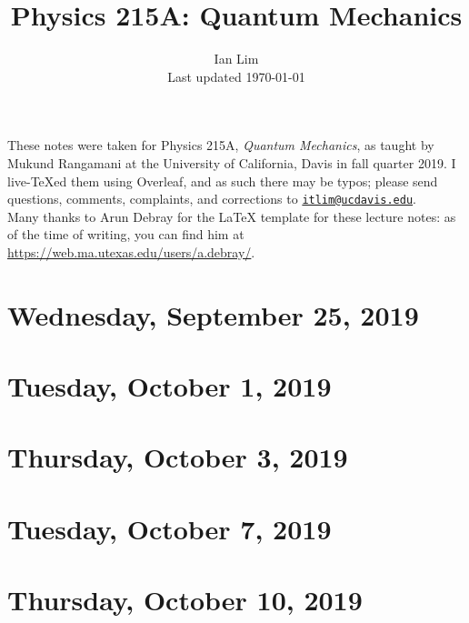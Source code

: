 \documentclass{../mynotes}
\begin{document}
\title{Physics 215A: Quantum Mechanics}
\author{Ian Lim\\ Last updated \today}
\maketitle
{\small\noindent These notes were taken for Physics 215A, \emph{Quantum Mechanics}, as taught by Mukund Rangamani at the University of California, Davis in fall quarter 2019. I live-\TeX ed them using Overleaf, and as such there may be typos; please send questions, comments, complaints, and corrections to 
\href{mailto:itlim@ucdavis.edu?subject=215A\%20Lecture\%20Notes}{\texttt{itlim@ucdavis.edu}}.\\
Many thanks to Arun Debray for the {\LaTeX} template for these lecture notes: as of the time of writing, you can find him at \url{https://web.ma.utexas.edu/users/a.debray/}.}

\tableofcontents

\section{Wednesday, September 25, 2019}
	

\section{Tuesday, October 1, 2019}
    

\section{Thursday, October 3, 2019}
    
\section{Tuesday, October 7, 2019}
    
    
\section{Thursday, October 10, 2019}
    
\end{document}
